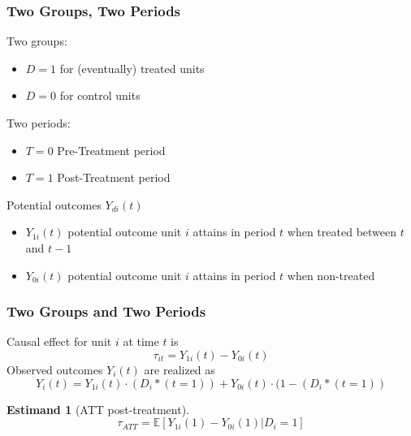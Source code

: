 \documentclass[xcolor=dvipsnames]{beamer}
\newcommand\E{\mathbb{E}}
\newtheorem{estm}{Estimand}
\begin{document}

\begin{frame}
  \frametitle{Two Groups, Two Periods}
\begin{Definition}
Two groups:
\footnotesize
\begin{itemize}
\item $D=1$ for (eventually) treated units
\item $D=0$ for control units
\end{itemize}\medskip
\small
Two periods:
\footnotesize
\begin{itemize}
\item $T=0$ Pre-Treatment period
\item $T=1$ Post-Treatment period
\end{itemize}\medskip
\small
Potential outcomes $Y_{di}(t)$
\footnotesize
\begin{itemize}
\item $Y_{1i}(t)$ potential outcome unit $i$ attains in period $t$ when treated between $t$ and $t-1$
\item $Y_{0i}(t)$ potential outcome unit $i$ attains in period $t$ when non-treated
\end{itemize}
\end{Definition}
\end{frame}

\begin{frame}
  \frametitle{Two Groups and Two Periods}
\begin{Definition}
Causal effect for unit $i$ at time $t$ is
\footnotesize
$$\tau_{it}=Y_{1i}(t)-Y_{0i}(t)$$
\small
\medskip
Observed outcomes $Y_i(t)$ are realized as
\footnotesize
$$Y_i(t)=Y_{1i}(t)\cdot (D_i*(t=1))+Y_{0i}(t)\cdot (1-(D_i*(t=1))$$
\end{Definition}
\small
\begin{estm}[ATT post-treatment]
$$\tau_{ATT}=\E[Y_{1i}(1)-Y_{0i}(1)|D_i=1]$$
\end{estm}
\end{frame}
\end{document}
